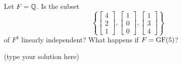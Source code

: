 
\begin{ProbBox} %
\begin{problem}[Golan 163]
Let $F = \mathbb{Q}$.  Is the subset
\[
\left\{ 
\begin{bmatrix}
  4\\[0.3em] 2\\[0.3em] 1
\end{bmatrix},
\begin{bmatrix}
  1\\[0.3em] 0\\[0.3em] 0
\end{bmatrix},
\begin{bmatrix}
  1\\[0.3em] 3\\[0.3em] 4
\end{bmatrix}
\right\}
\]
of $F^3$ linearly independent?  What happens if $F = \operatorname{GF}(5)$?
\end{problem}
\smallskip
\begin{solution}
(type your solution here)
\end{solution}
\end{ProbBox}
\probskip


